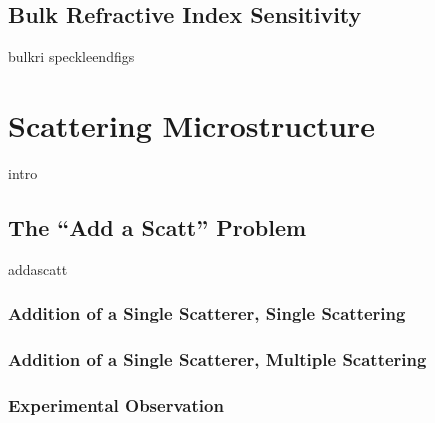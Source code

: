 \documentclass[a4paper,titlepage,onecolumn]{report}
\begin{document}
\section{Bulk Refractive Index Sensitivity} \label{sec:bulkri}
{bulkri}
\newpage
{speckleendfigs}


\chapter{Scattering Microstructure} \label{ch:scatteringmicro}
{intro}
\section{The ``Add a Scatt'' Problem}
{addascatt}
\subsection{Addition of a Single Scatterer, Single Scattering}
\subsection{Addition of a Single Scatterer, Multiple Scattering}
\subsection{Experimental Observation}
\end{document}
